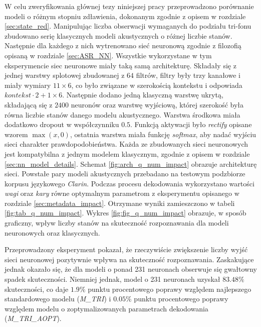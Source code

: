 \documentclass[shortabstract, mgr]{iithesis}
\begin{document}
		W celu zweryfikowania głównej tezy niniejszej pracy przeprowadzono porównanie modeli o różnym stopniu zdławienia, dokonanym zgodnie z opisem w rozdziale \ref{sec:state_red}. Manipulując liczba obserwacji wymaganych do podziału tri-fonu zbudowano serię klasycznych modeli akustycznych o różnej liczbie stanów. Następnie dla każdego z nich wytrenowano sieć neuronową zgodnie z filozofią opisaną w rozdziale \ref{sec:ASR_NN}. Wszystkie wykorzystane w tym eksperymencie siec neuronowe miały taką samą architekturę. Składały się z jednej warstwy splotowej zbudowanej z $64$ filtrów, filtry były trzy kanałowe i miały wymiary $11\times6$, co było związane w szerokością kontekstu i odpowiada $kontekst \cdot 2 + 1\times6$. Następnie dodano jedną klasyczną warstwę ukrytą, składającą się z $2400$ neuronów oraz warstwę wyjściową, której szerokość była równa liczbie stanów danego modelu akustycznego. Warstwa środkowa miała dodatkowo dropout w współczynniku $0.5$. Funkcją aktywacji było \textit{rectify} opisane wzorem $\max(x,0)$, ostatnia warstwa miała funkcję \textit{softmax}, aby nadać wyjściu sieci charakter prawdopodobieństwa. Każda ze zbudowanych sieci neuronowych jest kompatybilna z jednym modelem klasycznym, zgodnie z opisem w rozdziale \ref{sec:nn_model_details}. Schemat \ref{fig:arch_q_num_impact} obrazuje architekturę sieci. Powstałe pary modeli akustycznych przebadano na testowym podzbiorze korpusu językowego \textit{Clarin}. Podczas procesu dekodowania wykorzystano wartości \textit{wagi} oraz \textit{kary} równe optymalnym parametrom z eksperymentu opisanego w rozdziale \ref{sec:metadata_impact}. Otrzymane wyniki zamieszczono w tabeli \ref{fig:tab_q_num_impact}. Wykres \ref{fig:fig_q_num_impact} obrazuje, w sposób graficzny, wpływ liczby stanów na skuteczność rozpoznawania dla modeli neuronowych oraz klasycznych.
		
		Przeprowadzony eksperyment pokazał, że rzeczywiście zwiększenie liczby wyjść sieci neuronowej pozytywnie wpływa na skuteczność rozpoznawania. Zaskakujące jednak okazało się, że dla modeli o ponad 231 neuronach obserwuje się gwałtowny spadek skuteczności. Niemniej jednak, model o 231 neuronach uzyskał  $83.48\%$ skuteczności, co daje $1.9\%$ punktu procentowego poprawy względem najlepszego standardowego modelu (\textit{M\_TRI}) i $0.05\%$ punktu procentowego poprawy względem modelu o zoptymalizowanych parametrach dekodowania (\textit{M\_TRI\_AOPT}). 
		
\end{document}
